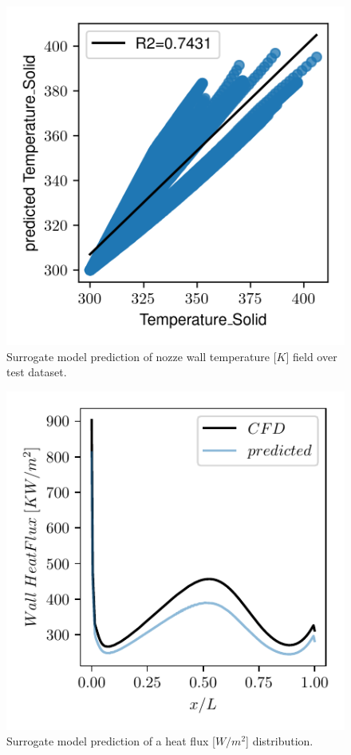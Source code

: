 \documentclass[10pt,oneside,a4paper,twocolumn]{article}
\begin{document}
\begin{figure}[htbp]
  \centering
  \includegraphics[width=\columnwidth]{figures/results/Temperature_Solid.png}
  \caption{Surrogate model prediction of nozze wall temperature [$K$] field over test dataset.}
  \label{fig:r2_temperature_solid}
\end{figure}


\begin{figure}[htbp]
  \centering
  \includegraphics[width=\columnwidth]{figures/predicted_wall_heat_flux.pdf}
  \caption{Surrogate model prediction of a heat flux [$W/m^2$] distribution.}
  \label{fig:wall_heat_flux}
\end{figure}
\end{document}
